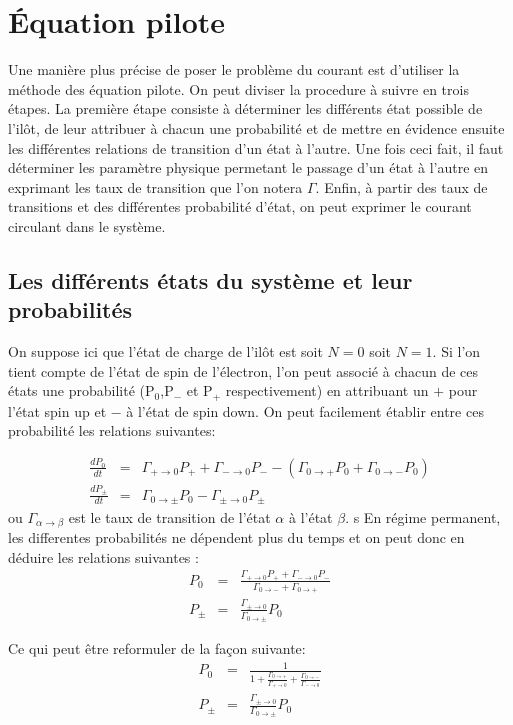 \chapter{\'Equation pilote}
Une manière plus précise de poser le problème du courant est d'utiliser la méthode des équation pilote. On peut diviser la procedure à suivre en trois étapes. La première étape consiste à déterminer les différents état possible de l'ilôt, de leur attribuer à chacun une probabilité et de mettre en évidence ensuite les différentes relations de transition d'un état à l'autre. Une fois ceci fait, il faut déterminer les paramètre physique permetant le passage d'un état à l'autre en exprimant les taux de transition que l'on notera $\Gamma$. Enfin, à partir des taux de transitions et des différentes probabilité d'état, on peut exprimer le courant circulant dans le système.

\section{Les différents états du système et leur probabilités}
On suppose ici que l'état de charge de l'ilôt est soit $N=0$ soit $N=1$. Si l'on tient compte de l'état de spin de l'électron, l'on peut associé à chacun de ces états une probabilité (P$_0$,P$_-$ et P$_+$ respectivement) en attribuant un $+$ pour l'état spin up et $-$ à l'état de spin down. On peut facilement établir entre ces probabilité les relations suivantes:

\begin{eqnarray}
\frac{dP_0}{dt} &=& \Gamma_{+ \rightarrow 0}P_+ + \Gamma_{- \rightarrow 0}P_-  -(\Gamma_{0 \rightarrow +}P_0 + \Gamma_{0 \rightarrow -}P_0) \nonumber \\
\frac{dP_\pm}{dt} &=& \Gamma_{0 \rightarrow \pm}P_0 - \Gamma_{\pm \rightarrow 0}P_\pm \nonumber
\end{eqnarray}
ou $\Gamma_{\alpha \rightarrow \beta}$ est le taux de transition de l'état $\alpha$ à l'état $\beta$. 
s
En régime permanent, les differentes probabilités ne dépendent plus du temps et on peut donc en déduire les relations suivantes :
\begin{eqnarray}
P_0 &=& \frac{\Gamma_{+ \rightarrow 0}P_{+} + \Gamma_{- \rightarrow 0}P_{-}}{\Gamma_{0 \rightarrow -} + \Gamma_{0 \rightarrow +} }\\
P_{\pm} &=& \frac{\Gamma_{\pm \rightarrow 0}}{\Gamma_{0 \rightarrow \pm}}P_0 
\end{eqnarray}

Ce qui peut être reformuler de la façon suivante:
\begin{eqnarray}
P_0 &=& \frac{1}{1 + \frac{\Gamma_{0 \rightarrow +}}{\Gamma_{+ \rightarrow 0}} + \frac{\Gamma_{0 \rightarrow -}}{\Gamma_{- \rightarrow 0}}} \\
P_{\pm} &=& \frac{\Gamma_{\pm \rightarrow 0}}{\Gamma_{0 \rightarrow \pm}}P_0 
\end{eqnarray}


